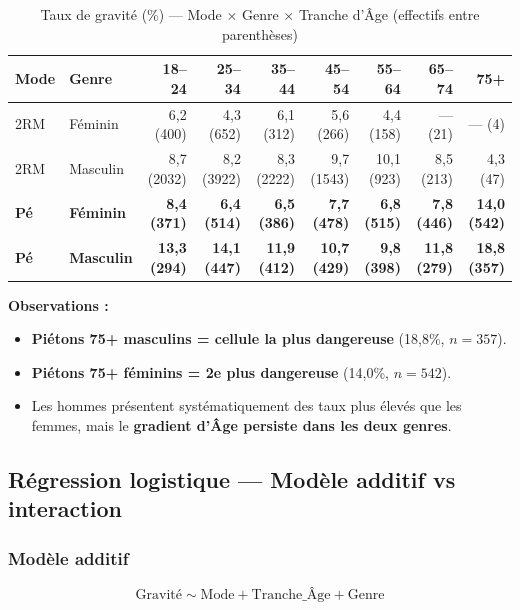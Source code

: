 \documentclass[12pt,a4paper]{article}
\begin{document}
\begin{table}[H]
\centering
\caption{Taux de gravité (\%) --- Mode $\times$ Genre $\times$ Tranche d'\^Age
         (effectifs entre parenthèses)}
\label{tab:4way}
\small
\begin{tabular}{@{}l l r r r r r r r@{}}
\toprule
\textbf{Mode} & \textbf{Genre} & \textbf{18--24} & \textbf{25--34}
  & \textbf{35--44} & \textbf{45--54} & \textbf{55--64}
  & \textbf{65--74} & \textbf{75+} \\
\midrule
2RM  & Féminin   & 6,2 (400)  & 4,3 (652)  & 6,1 (312)  & 5,6 (266)
     & 4,4 (158)  & --- (21)    & --- (4) \\
2RM  & Masculin  & 8,7 (2032) & 8,2 (3922) & 8,3 (2222) & 9,7 (1543)
     & 10,1 (923) & 8,5 (213)   & 4,3 (47) \\
\midrule
\textbf{Pé} & \textbf{Féminin} & \textbf{8,4 (371)}
  & \textbf{6,4 (514)} & \textbf{6,5 (386)} & \textbf{7,7 (478)}
  & \textbf{6,8 (515)} & \textbf{7,8 (446)} & \textbf{14,0 (542)} \\
\textbf{Pé} & \textbf{Masculin} & \textbf{13,3 (294)}
  & \textbf{14,1 (447)} & \textbf{11,9 (412)} & \textbf{10,7 (429)}
  & \textbf{9,8 (398)} & \textbf{11,8 (279)} & \textbf{18,8 (357)} \\
\bottomrule
\end{tabular}
\end{table}

\textbf{Observations :}
\begin{itemize}
  \item \textbf{Piétons 75+ masculins = cellule la plus dangereuse}
        (18,8\%, $n = 357$).
  \item \textbf{Piétons 75+ féminins = 2e plus dangereuse}
        (14,0\%, $n = 542$).
  \item Les hommes présentent systématiquement des taux plus élevés que
        les femmes, mais le \textbf{gradient d'\^Age persiste dans les deux
        genres}.
\end{itemize}

\subsection{Régression logistique --- Modèle additif vs interaction}

\subsubsection{Modèle additif}
\[
\text{Gravité} \sim \text{Mode} + \text{Tranche\_\^Age} + \text{Genre}
\]
\end{document}
